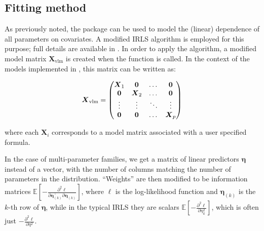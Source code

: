 \documentclass[
]{jss}
\newcommand{\1}{\mathcal{I}} \newcommand{\bZero}{\boldsymbol{0}}
\begin{document}
\subsection{Fitting method}\label{fitting-method}

As previously noted, the  package can be used to
model the (linear) dependence of all parameters on covariates. A
modified IRLS algorithm is employed for this purpose; full details are
available in \cite{VGAM-main}. In order to apply the algorithm, a
modified model matrix \(\boldsymbol{X}_{\text{vlm}}\) is created when
the  function is called. In the context of the
models implemented in , this matrix can be written
as:

\begin{equation}\label{X_vlm-definition}
  \boldsymbol{X}_{\text{vlm}}=
  \begin{pmatrix}
    \boldsymbol{X}_{1} & \boldsymbol{0}&\dotso &\boldsymbol{0}\cr
    \boldsymbol{0}& \boldsymbol{X}_{2} &\dotso &\boldsymbol{0}\cr
    \vdots & \vdots & \ddots & \vdots\cr
    \boldsymbol{0}& \boldsymbol{0}&\dotso &\boldsymbol{X}_{p}
  \end{pmatrix}
\end{equation}

where each \(\boldsymbol{X}_{i}\) corresponds to a model matrix
associated with a user specified formula.

In the case of multi-parameter families, we get a matrix of linear
predictors \(\boldsymbol{\eta}\) instead of a vector, with the number of
columns matching the number of parameters in the distribution.
``Weights'' are then modified to be information matrices
\(\displaystyle\mathbb{E}\left[-\frac{\partial^{2}\ell}{\partial\boldsymbol{\eta}_{(k)}^\top\partial\boldsymbol{\eta}_{(k)}}\right]\),
where \(\ell\) is the log-likelihood function and
\(\boldsymbol{\eta}_{(k)}\) is the \(k\)-th row of
\(\boldsymbol{\eta}\), while in the typical IRLS they are scalars
\(\displaystyle\mathbb{E}\left[-\frac{\partial^{2}\ell}{\partial\eta_{k}^{2}}\right]\),
which is often just
\(\displaystyle-\frac{\partial^{2}\ell}{\partial\eta^{2}}\).
\end{document}

